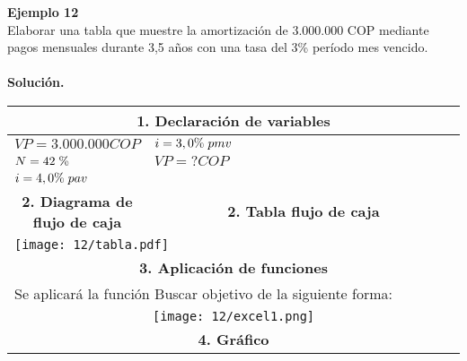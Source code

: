\textbf{Ejemplo 12}\\
Elaborar una tabla que muestre la amortización de  3.000.000 COP mediante pagos mensuales durante
3,5 años con una tasa del 3\% período mes vencido.\\ \\
\textbf{Solución.}\\
\begin{center}
 \renewcommand{\arraystretch}{1.5}%
 \begin{longtable}[H]{|p{0.3\linewidth}|p{0.7\linewidth}|}
  \hline
  \multicolumn{2}{|c|}{\cellcolor[HTML]{FFB183}\textbf{1. Declaración de variables}}                                                                                                                    \\ \hline
  $VP =  3.000.000 COP $ & $i = 3,0\% \hspace{1mm} pmv$ \\
  $N=42 \hspace{1mm} \%$ & $VP= ? COP$ \\
  $i=4,0\% \hspace{1mm} pav$&   \\
  \multicolumn{1}{|c|}{\cellcolor[HTML]{FFB183}\textbf{2. Diagrama de flujo de caja}} & \multicolumn{1}{|c|}{\cellcolor[HTML]{FFB183}\textbf{2. Tabla flujo de caja}}                                   \\ \hline
  \multicolumn{2}{|p{0.5\columnwidth}|}{ \texttt{[image: 12/tabla.pdf]}} \\ \hline
  \multicolumn{2}{|c|}{\cellcolor[HTML]{FFB183}\textbf{3. Aplicación de funciones}}                                                                                                                     \\ \hline
  \multicolumn{2}{|p{\columnwidth}|}{Se aplicará la función Buscar objetivo de la siguiente forma:}                                                                                                     \\
  \multicolumn{2}{|c|}{ \texttt{[image: 12/excel1.png]}}                                                                                                       \\ \hline
  \multicolumn{2}{|c|}{\cellcolor[HTML]{FFB183}\textbf{4. Gráfico}}                                                                                                                                     \\ \hline

\end{longtable}
\end{center}
